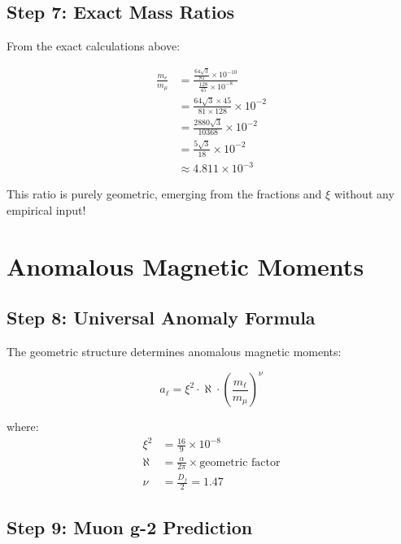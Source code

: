 \documentclass[12pt,a4paper]{article}
\newcommand{\xipar}{\xi}  %
\begin{document}
	\subsection{Step 7: Exact Mass Ratios}
	
	From the exact calculations above:
	
	\begin{keyresult}
		\begin{align}
			\frac{m_e}{m_\mu} &= \frac{\frac{64\sqrt{3}}{81} \times 10^{-10}}{\frac{128}{45} \times 10^{-8}} \\
			&= \frac{64\sqrt{3} \times 45}{81 \times 128} \times 10^{-2} \\
			&= \frac{2880\sqrt{3}}{10368} \times 10^{-2} \\
			&= \frac{5\sqrt{3}}{18} \times 10^{-2} \\
			&\approx 4.811 \times 10^{-3}
		\end{align}
		
		This ratio is purely geometric, emerging from the fractions and $\xipar$ without any empirical input!
	\end{keyresult}
	
	\section{Anomalous Magnetic Moments}
	
	\subsection{Step 8: Universal Anomaly Formula}
	
	The geometric structure determines anomalous magnetic moments:
	
	\begin{equation}
		a_\ell = \xipar^2 \cdot \aleph \cdot \left(\frac{m_\ell}{m_\mu}\right)^\nu
	\end{equation}
	
	where:
	\begin{align}
		\xipar^2 &= \frac{16}{9} \times 10^{-8} \\
		\aleph &= \frac{\alpha}{2\pi} \times \text{geometric factor} \\
		\nu &= \frac{D_f}{2} = 1.47
	\end{align}
	
	\subsection{Step 9: Muon g-2 Prediction}
	
\end{document}
